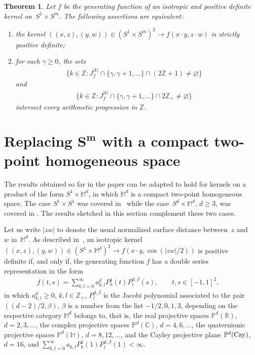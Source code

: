 \documentclass[pdftex]{sigma}
\numberwithin{equation}{section}
\newtheorem{Theorem}{Theorem}[section]
\begin{document}
\begin{Theorem}
Let $f$ be the generating function of an isotropic and positive definite kernel on~\mbox{$S^1 \times S^m$}. The following assertions are equivalent:
\begin{enumerate}\itemsep=0pt
\item[$(i)$] the kernel $((x,z), (y,w)) \in (S^1 \times S^m)^2 \to f(x \cdot y, z \cdot w)$ is strictly positive definite;
\item[$(ii)$] for each $\gamma \geq 0$, the sets
\begin{gather*}\big\{k\in \mathbb{Z}\colon J_f^{|k|} \cap \{\gamma,\gamma+1,\ldots\}\cap (2\mathbb{Z}+1)\neq \varnothing\big\}\end{gather*}
and
\begin{gather*}\big\{k\in \mathbb{Z}\colon J_f^{|k|} \cap \{\gamma,\gamma+1,\ldots\}\cap 2\mathbb{Z}_+\neq \varnothing\big\} \end{gather*}
intersect every arithmetic progression in $\mathbb{Z}$.
\end{enumerate}
\end{Theorem}

\section[Replacing $S^m$ with a compact two-point homogeneous space]{Replacing $\boldsymbol{S^m}$ with a compact two-point homogeneous space}\label{section4}

The results obtained so far in the paper can be adapted to hold for kernels on a product of the form $S^1 \times \mathbb{M}^d$, in which $\mathbb{M}^d$ is a compact two-point homogeneous space. The case $S^1 \times S^{1}$ was covered in~\cite{jean1} while the case~$S^d\times\mathbb{M}^d$, $d\geq 3$, was covered in \cite[Theorem~4.5]{barbosa1}. The results sketched in this section complement these two cases.

Let us write $|zw|$ to denote the usual normalized surface distance between~$z$ and~$w$ in~$\mathbb{M}^d$. As described in~\cite{barbosa1}, an isotropic kernel $((x,z), (y,w)) \in (S^1 \times \mathbb{M}^d)^2 \to f(x \cdot y, \cos (|zw|/2))$ is positive def\/inite if, and only if, the generating function $f$ has a double series representation in the form
\begin{gather*}
f(t,s) = \sum_{k,l=0}^\infty a_{k,l}^dP_k^{1}(t)P_l^{d,\beta}(s), \qquad t,s \in [-1,1]^2,
\end{gather*}
in which $a_{k,l}^d\geq 0$, $k,l\in \mathbb{Z}_+$, $P_l^{d,\beta}$ is the Jacobi polynomial associated to the pair $((d-2)/2,\beta)$, $\beta$ is a number from the list $-1/2, 0, 1, 3$, depending on the respective category $\mathbb{M}^d$ belongs to, that is, the real projective spaces $\mathbb{P}^d(\mathbb{R})$, $d=2,3,\ldots$, the complex projective spaces $\mathbb{P}^d(\mathbb{C})$, $d=4,6,\ldots$, the quaternionic projective spaces $\mathbb{P}^d(\mathbb{H})$, $d=8,12,\ldots$, and the Cayley projective plane $\mathbb{P}^{d}({\rm Cay})$, $d=16$, and $\sum\limits_{k,l=0}^\infty a_{k,l}P_k^{1}(1)P_l^{d,\beta}(1)<\infty$.
\end{document}
